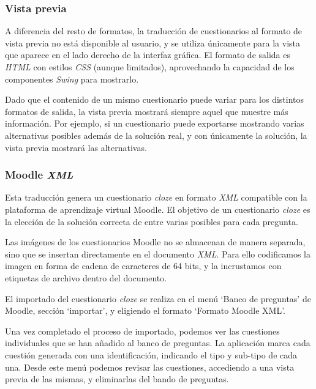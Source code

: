 \subsubsection{Vista previa}
A diferencia del resto de formatos, la traducción de cuestionarios al formato de vista previa no está disponible al usuario, y se utiliza únicamente para la vista que aparece en el lado derecho de la interfaz gráfica.
El formato de salida es \emph{HTML} con estilos \emph{CSS} (aunque limitados), aprovechando la capacidad de los componentes \emph{Swing} para mostrarlo.

Dado que el contenido de un mismo cuestionario puede variar para los distintos formatos de salida, la vista previa mostrará siempre aquel que muestre más información.
Por ejemplo, si un cuestionario puede exportarse mostrando varias alternativas posibles además de la solución real, y con únicamente la solución, la vista previa mostrará las alternativas.

\subsubsection{Moodle \emph{XML}}
Esta traducción genera un cuestionario \emph{cloze} en formato \emph{XML} compatible con la plataforma de aprendizaje virtual Moodle.
El objetivo de un cuestionario \emph{cloze} es la elección de la solución correcta de entre varias posibles para cada pregunta.

Las imágenes de los cuestionarios Moodle no se almacenan de manera separada, sino que se insertan directamente en el documento \emph{XML}.
Para ello codificamos la imagen en forma de cadena de caracteres de 64 bits, y la incrustamos con etiquetas de archivo dentro del documento.

El importado del cuestionario \emph{cloze} se realiza en el menú `Banco de preguntas' de Moodle, sección `importar', y eligiendo el formato `Formato Moodle XML'.


Una vez completado el proceso de importado, podemos ver las cuestiones individuales que se han añadido al banco de preguntas.
La aplicación marca cada cuestión generada con una identificación, indicando el tipo y sub-tipo de cada una.
Desde este menú podemos revisar las cuestiones, accediendo a una vista previa de las mismas, y eliminarlas del bando de preguntas.


